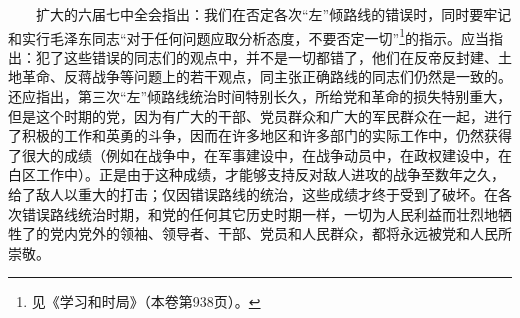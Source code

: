\documentclass[cn,11pt,chinese]{elegantbook}
\begin{document}
　　扩大的六届七中全会指出：我们在否定各次“左”倾路线的错误时，同时要牢记和实行毛泽东同志“对于任何问题应取分析态度，不要否定一切”\footnote[47]{ 见《学习和时局》（本卷第938页）。}的指示。应当指出：犯了这些错误的同志们的观点中，并不是一切都错了，他们在反帝反封建、土地革命、反蒋战争等问题上的若干观点，同主张正确路线的同志们仍然是一致的。还应指出，第三次“左”倾路线统治时间特别长久，所给党和革命的损失特别重大，但是这个时期的党，因为有广大的干部、党员群众和广大的军民群众在一起，进行了积极的工作和英勇的斗争，因而在许多地区和许多部门的实际工作中，仍然获得了很大的成绩（例如在战争中，在军事建设中，在战争动员中，在政权建设中，在白区工作中）。正是由于这种成绩，才能够支持反对敌人进攻的战争至数年之久，给了敌人以重大的打击；仅因错误路线的统治，这些成绩才终于受到了破坏。在各次错误路线统治时期，和党的任何其它历史时期一样，一切为人民利益而壮烈地牺牲了的党内党外的领袖、领导者、干部、党员和人民群众，都将永远被党和人民所崇敬。\\
\end{document}
